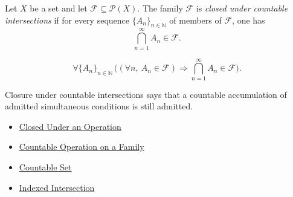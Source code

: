 \begin{definition}\label{def:closed-under-countable-intersections}
Let \(X\) be a set and let \(\mathcal{F}\subseteq\mathcal{P}(X)\).  The family
\(\mathcal{F}\) is \emph{closed under countable intersections} if for every
sequence \(\{A_n\}_{n\in\mathbb{N}}\) of members of \(\mathcal{F}\), one has
\[
  \bigcap_{n=1}^{\infty} A_n \in \mathcal{F}.
\]
\end{definition}

\begin{remark*}
\[
  \forall \{A_n\}_{n\in\mathbb{N}}\,
  \bigl((\forall n,\ A_n\in\mathcal{F})
  \Rightarrow
  \bigcap_{n=1}^{\infty}A_n\in\mathcal{F}\bigr).
\]
\end{remark*}

\begin{remark*}[Interpretation]
Closure under countable intersections says that a countable accumulation of
admitted simultaneous conditions is still admitted.
\end{remark*}

\begin{dependencies}
\begin{itemize}
  \item \hyperref[def:closed-under-operation]{Closed Under an Operation}
  \item \hyperref[def:countable-operation-on-family]{Countable Operation on a Family}
  \item \hyperref[def:countable]{Countable Set}
  \item \hyperref[def:indexed-intersection]{Indexed Intersection}
\end{itemize}
\end{dependencies}
